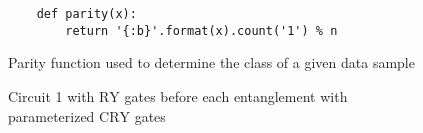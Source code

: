 \begin{figure}[!ht]
    \centering
    \begin{verbatim}
    def parity(x):
        return '{:b}'.format(x).count('1') % n
    \end{verbatim}
    \caption{Parity function used to determine the class of a given data sample}
    \label{fig:parity_function}
\end{figure}

\begin{figure}[!ht]
    \centering
    \caption{Circuit 1 with $\mathrm{RY}$ gates before each entanglement with parameterized $\mathrm{CRY}$ gates}
    \label{fig:qc_ryrycryry}
\end{figure}

